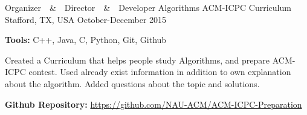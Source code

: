 \begin{cventries}
{    }
    \cventry
  	{Organizer~~\&~~Director~~\&~~Developer}
    {Algorithms ACM-ICPC Curriculum}
    {Stafford, TX, USA}
    {October-December 2015}
    {
      \begin{cvitems}
      	\item {\textbf{Tools:} C++, Java, C, Python, Git, Github}
        \item {Created a Curriculum that helps people study Algorithms, and prepare ACM-ICPC contest. Used already exist
information in addition to own explanation about the algorithm. Added questions about the topic and solutions.}
		\item{\textbf{Github Repository:}  \href{https://github.com/NAU-ACM/ACM-ICPC-Preparation}{https://github.com/NAU-ACM/ACM-ICPC-Preparation}}
      \end{cvitems}
    }
    
    {
    }
\end{cventries}
